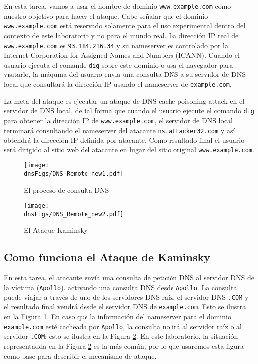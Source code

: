 En esta tarea, vamos a usar el nombre de dominio {\tt www.example.com} como nuestro objetivo para hacer el ataque. Cabe señalar que el dominio {\tt www.example.com} está reservado solamente para el uso experimental dentro del contexto de este laboratorio y no para el mundo real. La dirección IP real de {\tt www.example.com} es {\tt 93.184.216.34} y su nameserver es controlado por la Internet Corporation for Assigned Names and Numbers (ICANN).
Cuando el usuario ejecuta el comando {\tt dig} sobre este dominio o usa el navegador para visitarlo, la máquina del usuario envia una consulta DNS a su servidor de DNS local que consultará la dirección IP usando el nameserver de {\tt example.com}.

La meta del ataque es ejecutar un ataque de DNS cache poisoning attack en el servidor de DNS local, de tal forma que cuando el usuario ejecute el comando {\tt dig} para obtener la dirección IP de {\tt www.example.com}, el servidor de DNS local terminará consultando el nameserver del atacante {\tt ns.attacker32.com} y así obtendrá la dirección IP definida por atacante. Como resultado final el usuario será dirigido al sitio web del atacante en lugar del sitio original {\tt www.example.com}.



\begin{figure}[htb]
\centering
\texttt{[image: \\dnsFigs/DNS\_Remote\_new1.pdf]}
\caption{El proceso de consulta DNS} 
\label{fig:flow_diagram1}
\end{figure}


\begin{figure}[htb]
\centering
\texttt{[image: \\dnsFigs/DNS\_Remote\_new2.pdf]}
\caption{El Ataque Kaminsky}
\label{fig:flow_diagram2}
\end{figure}



\subsection{Como funciona el Ataque de Kaminsky}

En esta tarea, el atacante envía una consulta de petición DNS al servidor DNS de la víctima ({\tt Apollo}), activando una consulta DNS desde {\tt Apollo}.
La consulta puede viajar a través de uno de los servidores DNS raíz, el servidor DNS {\tt .COM} y el resultado final vendrá desde el servidor DNS de {\tt example.com}. Esto se ilustra en la Figura \ref{fig:flow_diagram1}. En caso que la información del nameserver para el dominio {\tt example.com} esté cacheada por {\tt Apollo}, la consulta no irá al servidor raíz o al servidor {\tt .COM}; esto se ilustra en la Figura \ref{fig:flow_diagram2}.
En este laboratorio, la situación representadda en la Figura \ref{fig:flow_diagram2} es la más común, por lo que usaremos esta figura como base para describir el mecanismo de ataque.


